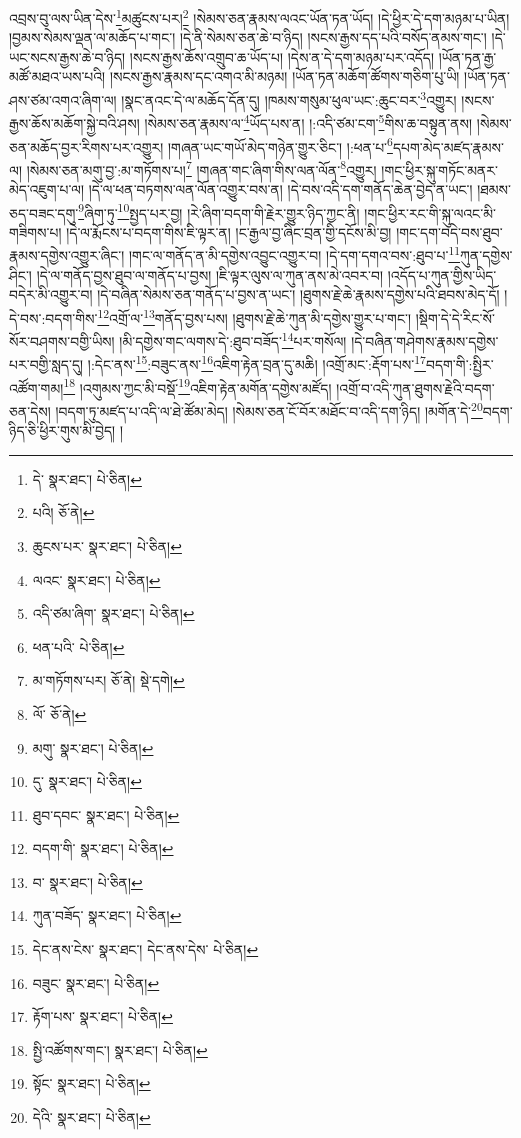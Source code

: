 འབྲས་བུ་ལས་ཡིན་དེས་\footnote{དེ་  སྣར་ཐང་།  པེ་ཅིན། }མཚུངས་པར།\footnote{པའི།  ཅོ་ནེ། } །སེམས་ཅན་རྣམས་ལའང་ཡོན་ཏན་ཡོད། །དེ་ཕྱིར་དེ་དག་མཉམ་པ་ཡིན། །བྱམས་སེམས་ལྡན་ལ་མཆོད་པ་གང་། །དེ་ནི་སེམས་ཅན་ཆེ་བ་ཉིད། །སངས་རྒྱས་དད་པའི་བསོད་ནམས་གང་། །དེ་ཡང་སངས་རྒྱས་ཆེ་བ་ཉིད། །སངས་རྒྱས་ཆོས་འགྲུབ་ཆ་ཡོད་པ། །དེས་ན་དེ་དག་མཉམ་པར་འདོད། །ཡོན་ཏན་རྒྱ་མཚོ་མཐའ་ཡས་པའི། །སངས་རྒྱས་རྣམས་དང་འགའ་མི་མཉམ། །ཡོན་ཏན་མཆོག་ཚོགས་གཅིག་པུ་ཡི། །ཡོན་ཏན་ཤས་ཙམ་འགའ་ཞིག་ལ། །སྣང་ནའང་དེ་ལ་མཆོད་དོན་དུ། །ཁམས་གསུམ་ཕུལ་ཡང་:ཆུང་བར་\footnote{ཆུངས་པར་  སྣར་ཐང་།  པེ་ཅིན། }འགྱུར། །སངས་རྒྱས་ཆོས་མཆོག་སྐྱེ་བའི་ཤས། །སེམས་ཅན་རྣམས་ལ་\footnote{ལའང་  སྣར་ཐང་།  པེ་ཅིན། }ཡོད་པས་ན། །:འདི་ཙམ་ངག་\footnote{འདི་ཙམ་ཞིག་  སྣར་ཐང་།  པེ་ཅིན། }གིས་ཆ་བསྟུན་ནས། །སེམས་ཅན་མཆོད་བྱར་རིགས་པར་འགྱུར། །གཞན་ཡང་གཡོ་མེད་གཉེན་གྱུར་ཅིང་། །:ཕན་པ་\footnote{ཕན་པའི་  པེ་ཅིན། }དཔག་མེད་མཛད་རྣམས་ལ། །སེམས་ཅན་མགུ་བྱ་:མ་གཏོགས་པ།\footnote{མ་གཏོགས་པར།  ཅོ་ནེ།  སྡེ་དགེ། } །གཞན་གང་ཞིག་གིས་ལན་ལོན་\footnote{ལོ་  ཅོ་ནེ། }འགྱུར། །གང་ཕྱིར་སྐུ་གཏོང་མནར་མེད་འཇུག་པ་ལ། །དེ་ལ་ཕན་བཏགས་ལན་ལོན་འགྱུར་བས་ན། །དེ་བས་འདི་དག་གནོད་ཆེན་བྱེད་ན་ཡང་། །ཐམས་ཅད་བཟང་དགུ་\footnote{མགུ་  སྣར་ཐང་།  པེ་ཅིན། }ཞིག་ཏུ་\footnote{དུ་  སྣར་ཐང་།  པེ་ཅིན། }སྤྱད་པར་བྱ། །རེ་ཞིག་བདག་གི་རྗེར་གྱུར་ཉིད་ཀྱང་ནི། །གང་ཕྱིར་རང་གི་སྐུ་ལའང་མི་གཟིགས་པ། །དེ་ལ་རྨོངས་པ་བདག་གིས་ཇི་ལྟར་ན། །ང་རྒྱལ་བྱ་ཞིང་བྲན་གྱི་དངོས་མི་བྱ། །གང་དག་བདེ་བས་ཐུབ་རྣམས་དགྱེས་འགྱུར་ཞིང་། །གང་ལ་གནོད་ན་མི་དགྱེས་འབྱུང་འགྱུར་བ། །དེ་དག་དགའ་བས་:ཐུབ་པ་\footnote{ཐུབ་དབང་  སྣར་ཐང་།  པེ་ཅིན། }ཀུན་དགྱེས་ཤིང་། །དེ་ལ་གནོད་བྱས་ཐུབ་ལ་གནོད་པ་བྱས། །ཇི་ལྟར་ལུས་ལ་ཀུན་ནས་མེ་འབར་བ། །འདོད་པ་ཀུན་གྱིས་ཡིད་བདེར་མི་འགྱུར་བ། །དེ་བཞིན་སེམས་ཅན་གནོད་པ་བྱས་ན་ཡང་། །ཐུགས་རྗེ་ཆེ་རྣམས་དགྱེས་པའི་ཐབས་མེད་དོ། །དེ་བས་:བདག་གིས་\footnote{བདག་གི་  སྣར་ཐང་།  པེ་ཅིན། }འགྲོ་ལ་\footnote{བ་  སྣར་ཐང་།  པེ་ཅིན། }གནོད་བྱས་པས། །ཐུགས་རྗེ་ཆེ་ཀུན་མི་དགྱེས་གྱུར་པ་གང་། །སྡིག་དེ་དེ་རིང་སོ་སོར་བཤགས་བགྱི་ཡིས། །མི་དགྱེས་གང་ལགས་དེ་:ཐུབ་བཟོད་\footnote{ཀུན་བཟོད་  སྣར་ཐང་།  པེ་ཅིན། }པར་གསོལ། །དེ་བཞིན་གཤེགས་རྣམས་དགྱེས་པར་བགྱི་སླད་དུ། །:དེང་ནས་\footnote{དེང་ནས་ངེས་  སྣར་ཐང་། དེང་ནས་དེས་  པེ་ཅིན། }:བཟུང་ནས་\footnote{བཟུང་  སྣར་ཐང་།  པེ་ཅིན། }འཇིག་རྟེན་བྲན་དུ་མཆི། །འགྲོ་མང་:རྡོག་པས་\footnote{རྟོག་པས་  སྣར་ཐང་།  པེ་ཅིན། }བདག་གི་:སྤྱིར་འཚོག་གམ།\footnote{སྤྱི་འཚོགས་གང་།  སྣར་ཐང་།  པེ་ཅིན། } །འགུམས་ཀྱང་མི་བསྡོ་\footnote{སྟོང་  སྣར་ཐང་།  པེ་ཅིན། }འཇིག་རྟེན་མགོན་དགྱེས་མཛོད། །འགྲོ་བ་འདི་ཀུན་ཐུགས་རྗེའི་བདག་ཅན་དེས། །བདག་ཏུ་མཛད་པ་འདི་ལ་ཐེ་ཚོམ་མེད། །སེམས་ཅན་ངོ་བོར་མཐོང་བ་འདི་དག་ཉིད། །མགོན་དེ་\footnote{དེའི་  སྣར་ཐང་།  པེ་ཅིན། }བདག་ཉིད་ཅི་ཕྱིར་གུས་མི་བྱེད། །
